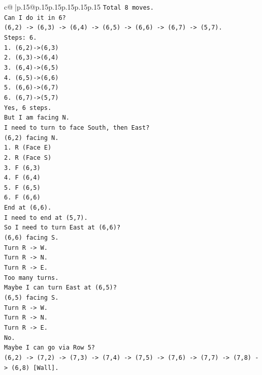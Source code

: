 \documentclass{article}
\begin{document}
{\begin{supertabular}{c@{$\;$}|p{.15\linewidth}@{}p{.15\linewidth}p{.15\linewidth}p{.15\linewidth}p{.15\linewidth}p{.15\linewidth}}
{{{\texttt{Total 8 moves.} \\
\texttt{Can I do it in 6?} \\
\texttt{(6,2) {-}> (6,3) {-}> (6,4) {-}> (6,5) {-}> (6,6) {-}> (6,7) {-}> (5,7).} \\
\texttt{Steps: 6.} \\
\texttt{1. (6,2){-}>(6,3)} \\
\texttt{2. (6,3){-}>(6,4)} \\
\texttt{3. (6,4){-}>(6,5)} \\
\texttt{4. (6,5){-}>(6,6)} \\
\texttt{5. (6,6){-}>(6,7)} \\
\texttt{6. (6,7){-}>(5,7)} \\
\texttt{Yes, 6 steps.} \\
\texttt{But I am facing N.} \\
\texttt{I need to turn to face South, then East?} \\
\texttt{(6,2) facing N.} \\
\texttt{1. R (Face E)} \\
\texttt{2. R (Face S)} \\
\texttt{3. F (6,3)} \\
\texttt{4. F (6,4)} \\
\texttt{5. F (6,5)} \\
\texttt{6. F (6,6)} \\
\texttt{End at (6,6).} \\
\texttt{I need to end at (5,7).} \\
\texttt{So I need to turn East at (6,6)?} \\
\texttt{(6,6) facing S.} \\
\texttt{Turn R {-}> W.} \\
\texttt{Turn R {-}> N.} \\
\texttt{Turn R {-}> E.} \\
\texttt{Too many turns.} \\
\texttt{Maybe I can turn East at (6,5)?} \\
\texttt{(6,5) facing S.} \\
\texttt{Turn R {-}> W.} \\
\texttt{Turn R {-}> N.} \\
\texttt{Turn R {-}> E.} \\
\texttt{No.} \\
\texttt{Maybe I can go via Row 5?} \\
\texttt{(6,2) {-}> (7,2) {-}> (7,3) {-}> (7,4) {-}> (7,5) {-}> (7,6) {-}> (7,7) {-}> (7,8) {-}> (6,8) {[}Wall{]}.} \\
}}}
\end{supertabular}}
\end{document}
